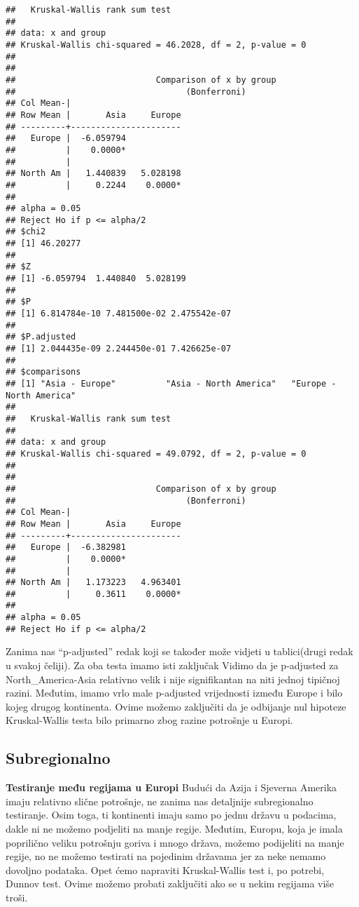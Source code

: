 \documentclass[
]{article}
\begin{document}
\begin{verbatim}
##   Kruskal-Wallis rank sum test
## 
## data: x and group
## Kruskal-Wallis chi-squared = 46.2028, df = 2, p-value = 0
## 
## 
##                            Comparison of x by group                            
##                                  (Bonferroni)                                  
## Col Mean-|
## Row Mean |       Asia     Europe
## ---------+----------------------
##   Europe |  -6.059794
##          |    0.0000*
##          |
## North Am |   1.440839   5.028198
##          |     0.2244    0.0000*
## 
## alpha = 0.05
## Reject Ho if p <= alpha/2
## $chi2
## [1] 46.20277
## 
## $Z
## [1] -6.059794  1.440840  5.028199
## 
## $P
## [1] 6.814784e-10 7.481500e-02 2.475542e-07
## 
## $P.adjusted
## [1] 2.044435e-09 2.244450e-01 7.426625e-07
## 
## $comparisons
## [1] "Asia - Europe"          "Asia - North America"   "Europe - North America"
## 
##   Kruskal-Wallis rank sum test
## 
## data: x and group
## Kruskal-Wallis chi-squared = 49.0792, df = 2, p-value = 0
## 
## 
##                            Comparison of x by group                            
##                                  (Bonferroni)                                  
## Col Mean-|
## Row Mean |       Asia     Europe
## ---------+----------------------
##   Europe |  -6.382981
##          |    0.0000*
##          |
## North Am |   1.173223   4.963401
##          |     0.3611    0.0000*
## 
## alpha = 0.05
## Reject Ho if p <= alpha/2
\end{verbatim}

Zanima nas ``p-adjusted'' redak koji se također može vidjeti u
tablici(drugi redak u svakoj čeliji). Za oba testa imamo isti zaključak
Vidimo da je p-adjusted za North\_America-Asia relativno velik i nije
signifikantan na niti jednoj tipičnoj razini. Međutim, imamo vrlo male
p-adjusted vrijednosti između Europe i bilo kojeg drugog kontinenta.
Ovime možemo zaključiti da je odbijanje nul hipoteze Kruskal-Wallis
testa bilo primarno zbog razine potrošnje u Europi.

\subsection{Subregionalno}\label{subregionalno}

\textbf{Testiranje među regijama u Europi} Budući da Azija i Sjeverna
Amerika imaju relativno slične potrošnje, ne zanima nas detaljnije
subregionalno testiranje. Osim toga, ti kontinenti imaju samo po jednu
državu u podacima, dakle ni ne možemo podjeliti na manje regije.
Međutim, Europu, koja je imala poprilično veliku potrošnju goriva i
mnogo država, možemo podijeliti na manje regije, no ne možemo testirati
na pojedinim državama jer za neke nemamo dovoljno podataka. Opet ćemo
napraviti Kruskal-Wallis test i, po potrebi, Dunnov test. Ovime možemo
probati zaključiti ako se u nekim regijama više troši.
\end{document}
